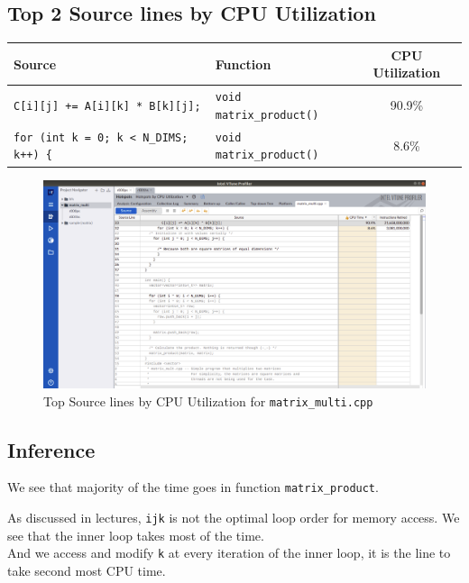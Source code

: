 \documentclass[11pt, swedish, openany]{book}
\begin{document}
\newpage
\subsection*{Top 2 Source lines by CPU Utilization}
\begin{table}[H]
    \begin{tabular}{||l|l||c||}
        \hline
        Source                                        & Function                        & CPU Utilization \\
        \hline
        \texttt{C[i][j] += A[i][k] * B[k][j];}        & \texttt{void matrix\_product()} & 90.9\%          \\
        \texttt{for (int k = 0; k < N\_DIMS; k++) \{} & \texttt{void matrix\_product()} & 8.6\%           \\
        \hline
    \end{tabular}
\end{table}

\begin{figure}[H]
    \centering
    \includegraphics[scale=0.25]{vtune/matrix_multi/sc.png}
    \caption{Top Source lines by CPU Utilization for \texttt{matrix\_multi.cpp}}
\end{figure}

\subsection*{Inference}
We see that majority of the time goes in function \texttt{matrix\_product}.

As discussed in lectures, \texttt{ijk} is not the optimal loop order for memory access. We see that the inner loop takes most of the time. \\
And we access and modify \texttt{k} at every iteration of the inner loop, it is the line to take second most CPU time.
\end{document}
